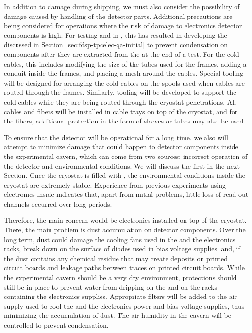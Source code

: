 In addition to damage during shipping, we must also consider the
possibility of damage caused by handling of the detector parts.
Additional precautions are being considered for operations where
the risk of damage to  electronics detector components is
high. For testing  and  
in \lntwo, this has resulted in developing the
 discussed in Section~\ref{sec:fdsp-tpcelec-qa-initial}
to prevent condensation on components after they are extracted from
the \lntwo at the end of a test. For the cold cables, this 
includes modifying the size of the tubes used for the  frames,
adding a conduit inside the frames, and placing a mesh around 
the cables. Special tooling will be designed for arranging the
cold cables on the spools used when cables are routed through
the  frames. Similarly, tooling will be developed to 
support the cold cables while they are being routed through the 
cryostat penetrations. All cables and fibers will
be installed in cable trays on top of the cryostat, and for the fibers, additional protection in the form of sleeves or tubes 
may also be used. 

To ensure that the  detector will be operational for a long
time, we also will attempt to minimize 
damage that could happen to detector components inside the 
experimental cavern, which can come from two sources: incorrect
operation of the detector and environmental conditions. We
will discuss the first in the next Section. Once the cryostat is filled with , the environmental
conditions inside the cryostat are extremely stable. Experience from 
previous experiments using electronics inside 
 indicates that, apart from initial problems, little loss of read-out channels occurred over long periods. 

Therefore, the main concern would be electronics 
installed on top of the cryostat. There, the main problem
is dust accumulation on detector components. Over the long
term, dust could damage the cooling fans used
in the  and the  electronics racks, break down 
on the surface of diodes used in bias voltage supplies,
and, if the dust contains any chemical residue that may
create deposits on printed circuit boards and leakage paths
between traces on printed circuit boards. While the
experimental cavern should be a very dry environment,
protections should still be in place to prevent water from 
dripping on the  and on the racks containing the
 electronics supplies. Appropriate filters will be added to the
air supply used to cool the  and the  electronics power and bias voltage supplies, thus minimizing
the accumulation of dust. The air humidity in the cavern 
will be controlled to prevent condensation.

